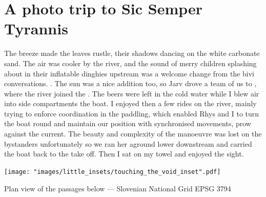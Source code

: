 \section{A photo trip to Sic Semper Tyrannis}
    \begin{marginfigure}
    \end{marginfigure}

    The breeze made the leaves rustle, their shadows dancing on the white carbonate sand. The air was cooler by the  river, and the sound of merry children splashing about in their inflatable dinghies upstream was a welcome change from the bivi conversations.
    . The sun was a nice addition too, so Jarv drove a team of us to , where the  river joined the . The beers were left in the cold water while I blew air into side compartments the boat.
    I enjoyed then a few rides on the river, mainly trying to enforce coordination in the paddling, which enabled Rhys and I to turn the boat round and maintain our position with synchronised movements, prow against the current. The beauty and complexity of the manoeuvre was lost on the bystanders unfortunately so we ran her aground lower downstream and carried the boat back to the take off. Then I sat on my towel and enjoyed the sight.


\begin{marginsurvey}
	\texttt{[image: "images/little\_insets/touching\_the\_void\_inset".pdf]}
	\caption[Davy Jones' Locker]{Plan view of the passages below \protect{} --- Slovenian National Grid EPSG 3794}
\end{marginsurvey}


